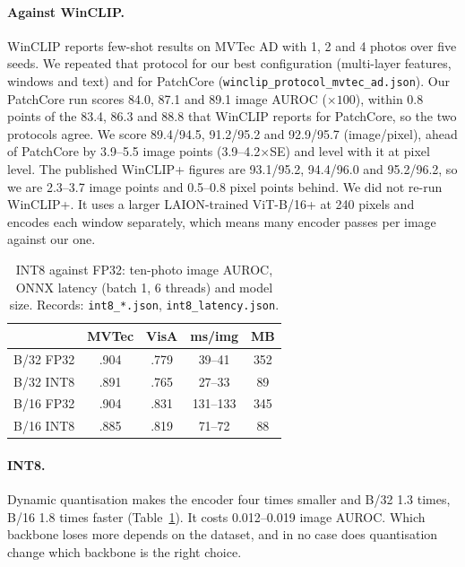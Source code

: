 \documentclass[10pt,twocolumn]{article}
\begin{document}
\paragraph{Against WinCLIP.} WinCLIP reports few-shot results on MVTec AD with
1, 2 and 4 photos over five seeds. We repeated that protocol for our best
configuration (multi-layer features, windows and text) and for PatchCore
(\texttt{winclip\_protocol\_mvtec\_ad.json}). Our PatchCore run scores 84.0, 87.1
and 89.1 image AUROC ($\times100$), within 0.8 points of the 83.4, 86.3 and 88.8
that WinCLIP reports for PatchCore, so the two protocols agree. We score
89.4/94.5, 91.2/95.2 and 92.9/95.7 (image/pixel), ahead of PatchCore by 3.9--5.5
image points (3.9--4.2$\times$SE) and level with it at pixel level. The published
WinCLIP+ figures are 93.1/95.2, 94.4/96.0 and 95.2/96.2, so we are 2.3--3.7 image
points and 0.5--0.8 pixel points behind. We did not re-run WinCLIP+. It uses a
larger LAION-trained ViT-B/16+ at 240 pixels and encodes each window separately,
which means many encoder passes per image against our one.

\begin{table}[t]
\centering\small
\caption{INT8 against FP32: ten-photo image AUROC, ONNX latency (batch 1,
6 threads) and model size. Records: \texttt{int8\_*.json},
\texttt{int8\_latency.json}.}
\label{tab:int8}
\begin{tabular}{lcccc}
\toprule
 & MVTec & VisA & ms/img & MB \\
\midrule
B/32 FP32 & .904 & .779 & 39--41 & 352 \\
B/32 INT8 & .891 & .765 & 27--33 & 89 \\
B/16 FP32 & .904 & .831 & 131--133 & 345 \\
B/16 INT8 & .885 & .819 & 71--72 & 88 \\
\bottomrule
\end{tabular}
\end{table}

\paragraph{INT8.} Dynamic quantisation makes the encoder four times smaller and
B/32 1.3 times, B/16 1.8 times faster (Table~\ref{tab:int8}). It costs 0.012--0.019
image AUROC. Which backbone loses more depends on the dataset, and in no case does
quantisation change which backbone is the right choice.
\end{document}
